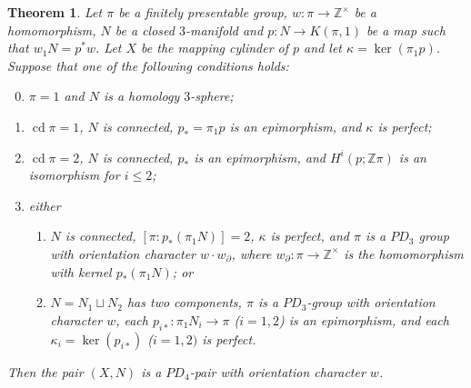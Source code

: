 \documentclass[12pt]{amsart}
\renewcommand{\leq}{\leqslant}
\newtheorem{theorem}{Theorem}
\theoremstyle{definition}
\newcommand{\Z}{\mathbb Z}
\DeclareMathOperator{\cd}{cd}
\begin{document}
\begin{theorem}
\label{PD4pair}
Let $\pi$ be a finitely presentable group,  $w:\pi\to\mathbb{Z}^\times$ be a homomorphism, 
$N$ be a closed $3$-manifold and $p:N\to{K(\pi,1)}$ be a map such that $w_1N=p^*w$.
Let $X$ be the mapping cylinder of $p$ and let $\kappa=\ker(\pi_1p)$.
Suppose that one of the following conditions holds:
\begin{enumerate}
 \setcounter{enumi}{-1}
\item$\pi=1$ and $N$ is a homology $3$-sphere;
\item$\cd \pi=1$, $N$ is connected, $p_*=\pi_1p$ is an epimorphism, and $\kappa$ is perfect;
\item$\cd \pi=2$, $N$ is connected,  $p_*$ is an epimorphism, and 
$H^i(p;\Z\pi)$ is an isomorphism for $i\leq2$;
\item either
\begin{enumerate}
\item$N$ is connected, $[\pi:p_*(\pi_1N)]=2$, $\kappa$ is perfect, 
and $\pi$ is a $PD_3$ group with orientation character $w\cdot w_\partial$, 
where $w_\partial: \pi \to \mathbb{Z}^\times$ is the homomorphism with kernel $p_*(\pi_1N)$; or
\item $N = N_1 \sqcup N_2$ has two components, 
$\pi$ is a $PD_3$-group with orientation character $w$, 
each $p_{i*} : \pi_1 N_i \to \pi$ ($i = 1,2$) is an epimorphism, 
and each $\kappa_i = \ker(p_{i*})$ ($i = 1,2)$ is perfect.
\end{enumerate}
\end{enumerate}
Then the pair $(X,N)$ is a $PD_4$-pair with orientation character $w$.
\end{theorem}
\end{document}
